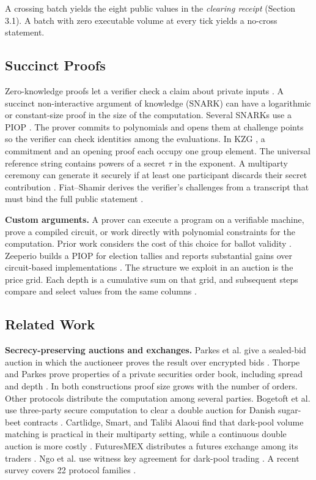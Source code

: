 A crossing batch yields the eight public values in the \emph{clearing receipt} (Section 3.1). A batch with zero executable volume at every tick yields a no-cross statement.

\subsection{Succinct Proofs}

Zero-knowledge proofs let a verifier check a claim about private inputs \cite{bcc1988,gmw1986}. A succinct non-interactive argument of knowledge (SNARK) can have a logarithmic or constant-size proof in the size of the computation. Several SNARKs \cite{marlin2020,plonk2019,sonic2019} use a PIOP \cite{dark2020}. The prover commits to polynomials and opens them at challenge points so the verifier can check identities among the evaluations. In KZG \cite{kzg2010}, a commitment and an opening proof each occupy one group element. The universal reference string contains powers of a secret \(\tau\) in the exponent. A multiparty ceremony can generate it securely if at least one participant discards their secret contribution \cite{nikolaenko2024}. Fiat--Shamir \cite{fiatshamir1986} derives the verifier's challenges from a transcript that must bind the full public statement \cite{bernhard2012,dao2023}.

\textbf{Custom arguments.} A prover can execute a program on a verifiable machine, prove a compiled circuit, or work directly with polynomial constraints for the computation. Prior work considers the cost of this choice for ballot validity \cite{huber2024}. Zeeperio builds a PIOP for election tallies and reports substantial gains over circuit-based implementations \cite{zeeperio2026}. The structure we exploit in an auction is the price grid. Each depth is a cumulative sum on that grid, and subsequent steps compare and select values from the same columns \cite{plonkbook}.

\subsection{Related Work}

\textbf{Secrecy-preserving auctions and exchanges.} Parkes et al. give a sealed-bid auction in which the auctioneer proves the result over encrypted bids \cite{parkes2008}. Thorpe and Parkes prove properties of a private securities order book, including spread and depth \cite{thorpe2007}. In both constructions proof size grows with the number of orders. Other protocols distribute the computation among several parties. Bogetoft et al. use three-party secure computation to clear a double auction for Danish sugar-beet contracts \cite{bogetoft2009}. Cartlidge, Smart, and Talibi Alaoui find that dark-pool volume matching is practical in their multiparty setting, while a continuous double auction is more costly \cite{cartlidge2019}. FuturesMEX distributes a futures exchange among its traders \cite{massacci2018}. Ngo et al. use witness key agreement for dark-pool trading \cite{ngo2021}. A recent survey covers 22 protocol families \cite{arote2026}.

